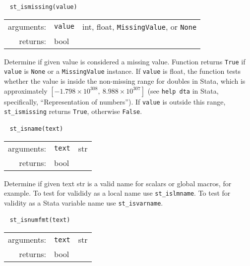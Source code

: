 \documentclass{article}
\begin{document}
			
			\ \newline
			\noindent \lstinline$st_ismissing(value)$
								
			\vspace{1.5mm}
			\noindent 
			\indent \begin{tabular}{rrl}
					arguments: & \texttt{value} & int, float, \lstinline$MissingValue$, or \texttt{None} \\
					returns: & \multicolumn{2}{l}{bool}
				\end{tabular}
								
			\vspace{1.5mm}
			\noindent Determine if given value is considered a missing value. Function returns \lstinline{True} if \lstinline{value} is \lstinline{None} or a \lstinline{MissingValue} instance. If \lstinline{value} is float, the function tests whether the value is inside the non-missing range for doubles in Stata, which is approximately $[-1.798 \times 10^{308},\ 8.988 \times 10^{307}]$ (see \lstinline{help dta} in Stata, specifically, ``Representation of numbers''). If \lstinline{value} is outside this range, \lstinline{st_ismissing} returns \lstinline{True}, otherwise \lstinline{False}. \newline
		
			
			\ \newline
			\noindent \lstinline$st_isname(text)$
								
			\vspace{1.5mm}
			\noindent 
			\indent \begin{tabular}{rrl}
					arguments: & \texttt{text} & str \\
					returns: & \multicolumn{2}{l}{bool}
				\end{tabular}
								
			\vspace{1.5mm}
			\noindent Determine if given text str is a valid name for scalars or global macros, for example. To test for valididy as a local name use \lstinline$st_islmname$. To test for validity as a Stata variable name use \lstinline$st_isvarname$. \newline
			
			
			\ \newline
			\noindent \lstinline$st_isnumfmt(text)$
								
			\vspace{1.5mm}
			\noindent 
			\indent \begin{tabular}{rrl}
					arguments: & \texttt{text} & str \\
					returns: & \multicolumn{2}{l}{bool}
				\end{tabular}
								
\end{document}
